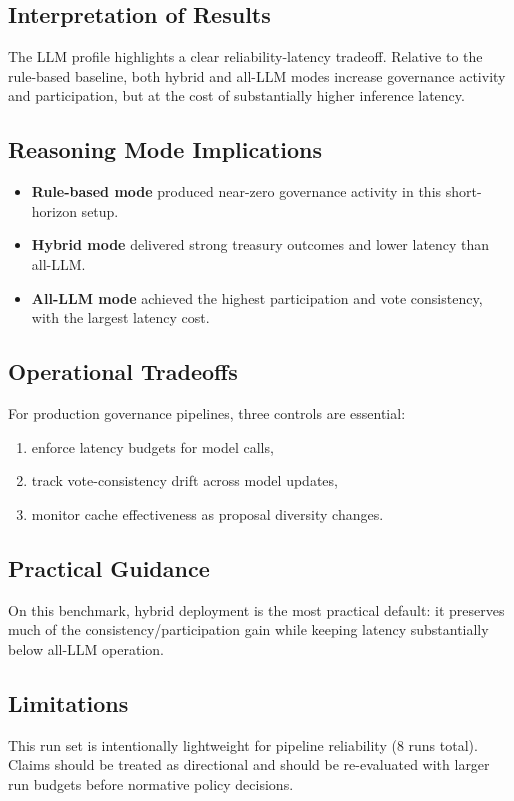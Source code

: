
\subsection{Interpretation of Results}

The LLM profile highlights a clear reliability-latency tradeoff. Relative to the
rule-based baseline, both hybrid and all-LLM modes increase governance activity and
participation, but at the cost of substantially higher inference latency.

\subsection{Reasoning Mode Implications}

\begin{itemize}
    \item \textbf{Rule-based mode} produced near-zero governance activity in this short-horizon setup.
    \item \textbf{Hybrid mode} delivered strong treasury outcomes and lower latency than all-LLM.
    \item \textbf{All-LLM mode} achieved the highest participation and vote consistency, with the largest latency cost.
\end{itemize}

\subsection{Operational Tradeoffs}

For production governance pipelines, three controls are essential:

\begin{enumerate}
    \item enforce latency budgets for model calls,
    \item track vote-consistency drift across model updates,
    \item monitor cache effectiveness as proposal diversity changes.
\end{enumerate}

\subsection{Practical Guidance}

On this benchmark, hybrid deployment is the most practical default: it preserves much
of the consistency/participation gain while keeping latency substantially below all-LLM
operation.

\subsection{Limitations}

This run set is intentionally lightweight for pipeline reliability (8 runs total).
Claims should be treated as directional and should be re-evaluated with larger run
budgets before normative policy decisions.
